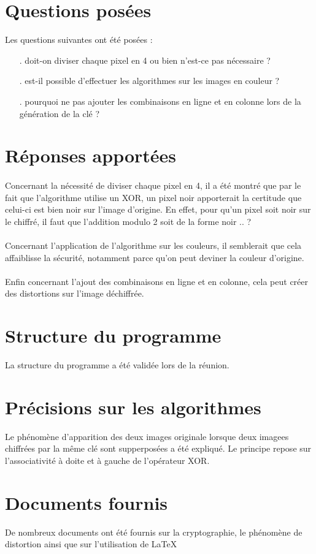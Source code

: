 \documentclass{report}
\begin{document}
\section*{Questions posées}
Les questions suivantes ont été posées : 
\begin{itemize}
	\item[.] doit-on diviser chaque pixel en 4 ou bien n'est-ce pas nécessaire ?
	\item[.] est-il possible d'effectuer les algorithmes sur les images en couleur ?
	\item[.] pourquoi ne pas ajouter les combinaisons en ligne et en colonne lors de la génération de la clé ?
\end{itemize}

\section*{Réponses apportées}
\paragraph*{}
Concernant la nécessité de diviser chaque pixel en 4, il a été montré que par le fait que l'algorithme utilise un XOR, un pixel noir apporterait la certitude que celui-ci est bien noir sur l'image d'origine. En effet, pour qu'un pixel soit noir sur le chiffré, il faut que l'addition modulo 2 soit de la forme noir .. ?
\paragraph*{}
Concernant l'application de l'algorithme sur les couleurs, il semblerait que cela affaiblisse la sécurité, notamment parce qu'on peut deviner la couleur d'origine.
\paragraph*{}
Enfin concernant l'ajout des combinaisons en ligne et en colonne, cela peut créer des distortions sur l'image déchiffrée.

\section*{Structure du programme}
La structure du programme a été validée lors de la réunion.

\section*{Précisions sur les algorithmes}
Le phénomène d'apparition des deux images originale lorsque deux imagees chiffrées par la même clé sont supperposées a été expliqué.
Le principe repose sur l'associativité à doite et à gauche de l'opérateur XOR.

\section*{Documents fournis}
De nombreux documents ont été fournis sur la cryptographie, le phénomène de distortion ainsi que sur l'utilisation de \LaTeX
\end{document}
